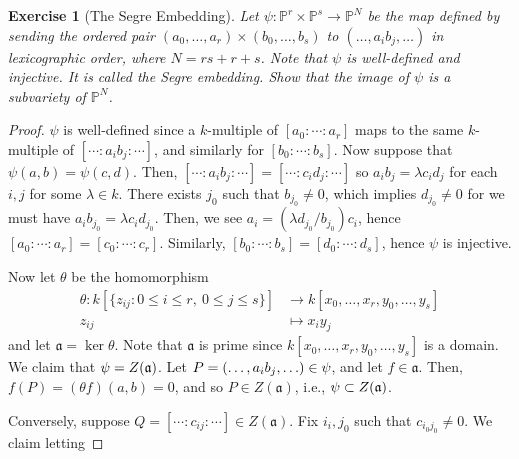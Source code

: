 \documentclass[12pt,letterpaper]{article}
\newtheorem{problem}{Exercise}[section]
\theoremstyle{definition}
\theoremstyle{remark}
\numberwithin{equation}{section}
\numberwithin{figure}{problem}
\let\Im\relax
\DeclareMathOperator{\Im}{im}
\newcommand{\PP}{\mathbb{P}}
\begin{document}
\begin{problem}[The Segre Embedding]
  Let $\psi\colon \PP^r \times \PP^s \to \PP^N$ be the map defined by sending
  the ordered pair $(a_0, \ldots, a_r) \times (b_0, \ldots, b_s)$ to $(\ldots,
  a_ib_j, \ldots)$ in lexicographic order, where $N = rs + r +s$. Note that
  $\psi$ is well-defined and injective. It is called the \emph{Segre embedding}.
  Show that the image of $\psi$ is a subvariety of $\PP^N$.
\end{problem}
\begin{proof}
  $\psi$ is well-defined since a $k$-multiple of $[a_0:\cdots:a_r]$ maps to the
  same $k$-multiple of $[\cdots:a_ib_j:\cdots]$, and similarly for
  $[b_0:\cdots:b_s]$. Now suppose that $\psi(a,b) = \psi(c,d)$. Then,
  $[\cdots:a_ib_j:\cdots] = [\cdots:c_id_j:\cdots]$ so $a_ib_j = \lambda c_id_j$
  for each $i,j$ for some $\lambda \in k$. There exists $j_0$ such that
  $b_{j_0} \ne 0$, which implies $d_{j_0} \ne 0$ for we must have
  $a_ib_{j_0} = \lambda c_id_{j_0}$. Then, we see $a_i = (\lambda
  d_{j_0}/b_{j_0}) c_i$, hence $[a_0:\cdots:a_r] = [c_0:\cdots:c_r]$. Similarly,
  $[b_0:\cdots:b_s] = [d_0:\cdots:d_s]$, hence $\psi$ is injective.
  \par Now let $\theta$ be the homomorphism
  \begin{align*}
    \theta\colon k[\{z_{ij} : 0\le i \le r,\ 0 \le j \le s\}] &\to
    k[x_0, \ldots, x_r, y_0, \ldots, y_s]\\
    z_{ij} &\mapsto x_iy_j
  \end{align*}
  and let $\mathfrak{a} = \ker\theta$. Note that $\mathfrak{a}$ is prime since
  $k[x_0, \ldots, x_r, y_0, \ldots, y_s]$ is a domain.
  We claim that $\Im \psi = Z(\mathfrak{a})$. Let $P = (\ldots, a_ib_j,\ldots)
  \in \Im \psi$, and let $f \in \mathfrak{a}$. Then, $f(P) = (\theta f)(a,b) =
  0$, and so $P \in Z(\mathfrak{a})$, i.e., $\Im \psi \subset Z(\mathfrak{a})$.
  \par Conversely, suppose $Q = [\cdots:c_{ij}:\cdots] \in Z(\mathfrak{a})$.
  Fix $i_i,j_0$ such that $c_{i_0j_0} \ne 0$. We claim letting

\end{proof}
\end{document}
